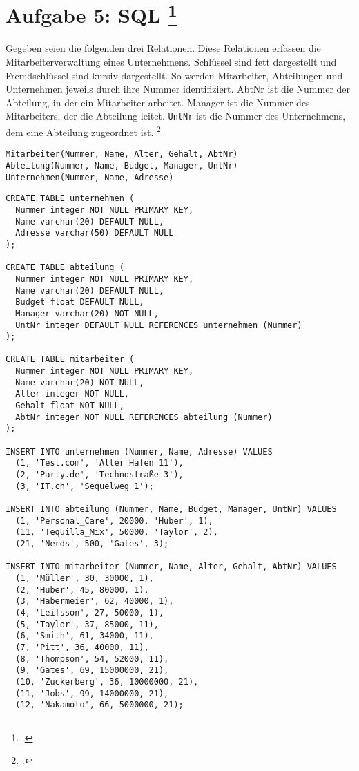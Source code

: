 \documentclass{lehramt-informatik-aufgabe}
\begin{document}

\section{Aufgabe 5: SQL
\footcite[Thema 1 Aufgabe 5]{66113:2003:03}}

Gegeben seien die folgenden drei Relationen. Diese Relationen erfassen
die Mitarbeiterverwaltung eines Unternehmens. Schlüssel sind fett
dargestellt und Fremdschlüssel sind kursiv dargestellt. So werden
Mitarbeiter, Abteilungen und Unternehmen jeweils durch ihre Nummer
identifiziert. AbtNr ist die Nummer der Abteilung, in der ein
Mitarbeiter arbeitet. Manager ist die Nummer des Mitarbeiters, der die
Abteilung leitet. \verb|UntNr| ist die Nummer des Unternehmens, dem eine
Abteilung zugeordnet ist.
\footcite[Aufgabe 2: SQL]{db:pu:2}

\begin{verbatim}
Mitarbeiter(Nummer, Name, Alter, Gehalt, AbtNr)
Abteilung(Nummer, Name, Budget, Manager, UntNr)
Unternehmen(Nummer, Name, Adresse)
\end{verbatim}

\begin{verbatim}
CREATE TABLE unternehmen (
  Nummer integer NOT NULL PRIMARY KEY,
  Name varchar(20) DEFAULT NULL,
  Adresse varchar(50) DEFAULT NULL
);

CREATE TABLE abteilung (
  Nummer integer NOT NULL PRIMARY KEY,
  Name varchar(20) DEFAULT NULL,
  Budget float DEFAULT NULL,
  Manager varchar(20) NOT NULL,
  UntNr integer DEFAULT NULL REFERENCES unternehmen (Nummer)
);

CREATE TABLE mitarbeiter (
  Nummer integer NOT NULL PRIMARY KEY,
  Name varchar(20) NOT NULL,
  Alter integer NOT NULL,
  Gehalt float NOT NULL,
  AbtNr integer NOT NULL REFERENCES abteilung (Nummer)
);

INSERT INTO unternehmen (Nummer, Name, Adresse) VALUES
  (1, 'Test.com', 'Alter Hafen 11'),
  (2, 'Party.de', 'Technostraße 3'),
  (3, 'IT.ch', 'Sequelweg 1');

INSERT INTO abteilung (Nummer, Name, Budget, Manager, UntNr) VALUES
  (1, 'Personal_Care', 20000, 'Huber', 1),
  (11, 'Tequilla_Mix', 50000, 'Taylor', 2),
  (21, 'Nerds', 500, 'Gates', 3);

INSERT INTO mitarbeiter (Nummer, Name, Alter, Gehalt, AbtNr) VALUES
  (1, 'Müller', 30, 30000, 1),
  (2, 'Huber', 45, 80000, 1),
  (3, 'Habermeier', 62, 40000, 1),
  (4, 'Leifsson', 27, 50000, 1),
  (5, 'Taylor', 37, 85000, 11),
  (6, 'Smith', 61, 34000, 11),
  (7, 'Pitt', 36, 40000, 11),
  (8, 'Thompson', 54, 52000, 11),
  (9, 'Gates', 69, 15000000, 21),
  (10, 'Zuckerberg', 36, 10000000, 21),
  (11, 'Jobs', 99, 14000000, 21),
  (12, 'Nakamoto', 66, 5000000, 21);
\end{verbatim}
\end{document}
